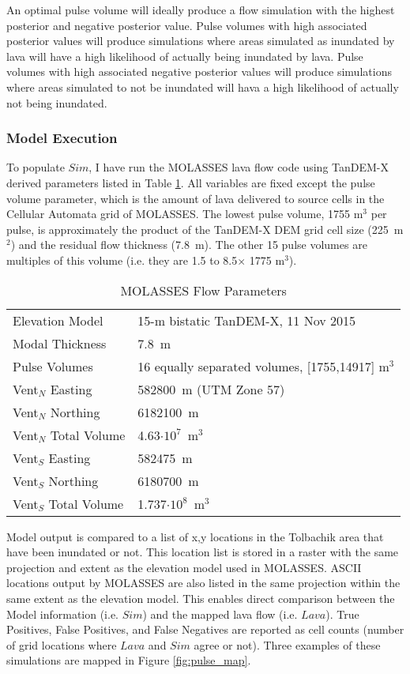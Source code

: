 		An optimal pulse volume will ideally produce a flow simulation with the highest posterior and negative posterior value. Pulse volumes with high associated posterior values will produce simulations where areas simulated as inundated by lava will have a high likelihood of actually being inundated by lava. Pulse volumes with high associated negative posterior values will produce simulations where areas simulated to not be inundated will hava a high likelihood of actually not being inundated.
		
		\subsubsection{Model Execution} 
		To populate $Sim$, I have run the MOLASSES lava flow code using TanDEM-X derived parameters listed in Table \ref{tab_parameters_pulsebayes}. All variables are fixed except the pulse volume parameter, which is the amount of lava delivered to source cells in the Cellular Automata grid of MOLASSES. The lowest pulse volume, 1755 m$^3$ per pulse, is approximately the product of the TanDEM-X DEM grid cell size (225~m$^2$) and the residual flow thickness (7.8~m). The other 15 pulse volumes are multiples of this volume (i.e. they are 1.5 to 8.5$\times$ 1775 m$^3$).
		
		\begin{table}[h!]
		\centering
			\caption{MOLASSES Flow Parameters}
			\begin{tabular}{l l}
				\toprule
				Elevation Model & 15-m bistatic TanDEM-X, 11 Nov 2015\\
				Modal Thickness & 7.8~m\\
				Pulse Volumes & 16 equally separated volumes, [1755,14917] m$^3$\\
				\midrule
				Vent$_N$ Easting & 582800~m (UTM Zone 57)\\
				Vent$_N$ Northing & 6182100~m\\
				Vent$_N$ Total Volume & 4.63$\cdot10^7$~m$^3$\\
				\midrule
				Vent$_S$ Easting & 582475~m\\
				Vent$_S$ Northing & 6180700~m\\
				Vent$_S$ Total Volume & 1.737$\cdot10^8$~m$^3$\\
				\bottomrule
			\end{tabular}
			\label{tab_parameters_pulsebayes}
		\end{table}
		

		Model output is compared to a list of x,y locations in the Tolbachik area that have been inundated or not. This location list is stored in a raster with the same projection and extent as the elevation model used in MOLASSES. ASCII locations output by MOLASSES are also listed in the same projection within the same extent as the elevation model. This enables direct comparison between the Model information (i.e. $Sim$) and the mapped lava flow (i.e. $Lava$). True Positives, False Positives, and False Negatives are reported as cell counts (number of grid locations where $Lava$ and $Sim$ agree or not). Three examples of these simulations are mapped in Figure \ref{fig:pulse_map}.

